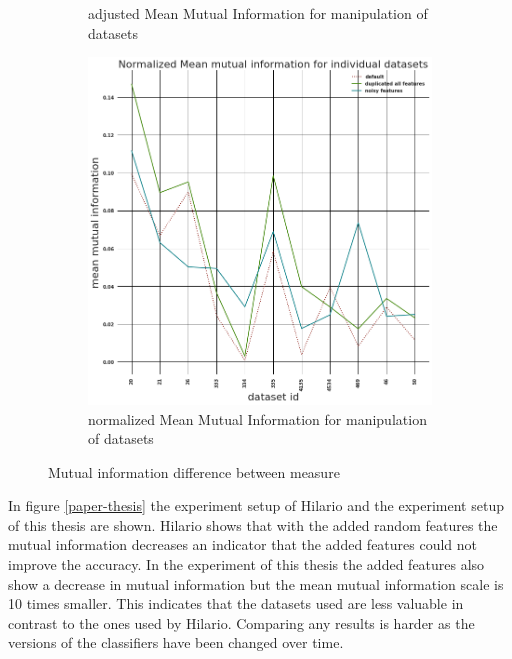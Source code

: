 \documentclass[a4paper,10pt]{article}
\begin{document}
\begin{figure}[H]
\begin{subfigure}[b]{0.45\textwidth}
		\caption{adjusted Mean Mutual Information for manipulation of datasets}
		\label{fig:AMMI}
	\end{subfigure}
	\begin{subfigure}[b]{0.45\textwidth}
		\includegraphics[width=\textwidth]{images/normalizedMeanMutualInformation.png}
		\caption{normalized Mean Mutual Information for manipulation of datasets}
		\label{fig:NMMI}
	\end{subfigure}
	\caption{Mutual information difference between measure}\label{fig:MMIs}
\end{figure}

In figure \ref{paper-thesis} the experiment setup of Hilario and the experiment setup of this thesis are shown\cite{Resil-1}. Hilario shows that with the added random features the mutual information decreases an indicator that the added features could not improve the accuracy. In the experiment of this thesis the added features also show a decrease in mutual information but the mean mutual information scale is 10 times smaller. This indicates that the datasets used are less valuable in contrast to the ones used by Hilario. Comparing any results is harder as the versions of the classifiers have been changed over time.
\end{document}
